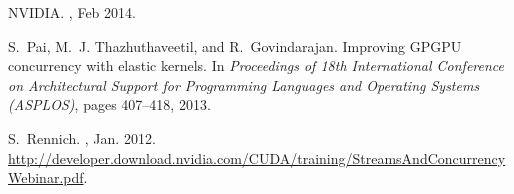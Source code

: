 \documentclass[twocolumn]{el-author}
\begin{document}
\begin{thebibliography}{10}
{NVIDIA}.
, Feb 2014.

S.~Pai, M.~J. Thazhuthaveetil, and R.~Govindarajan.
\newblock Improving {GPGPU} concurrency with elastic kernels.
\newblock In {\em Proceedings of 18th International Conference on Architectural
  Support for Programming Languages and Operating Systems (ASPLOS)}, pages
  407--418, 2013.

S.~Rennich.
, Jan. 2012.
\newblock
  \url{http://developer.download.nvidia.com/CUDA/training/StreamsAndConcurrencyWebinar.pdf}.

\end{thebibliography}
\end{document}
